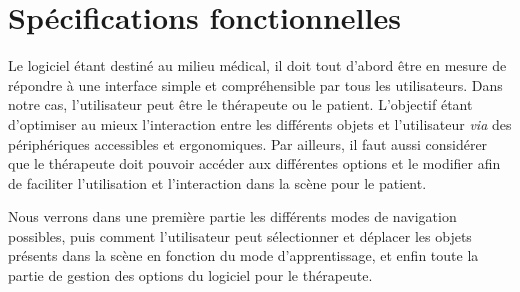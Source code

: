 \section{Spécifications fonctionnelles}

Le logiciel étant destiné au milieu médical, il doit tout d'abord être en mesure de répondre à une interface simple et compréhensible par tous les utilisateurs. Dans notre cas, l'utilisateur peut être le thérapeute ou le patient. L'objectif étant d'optimiser au mieux l'interaction entre les différents objets et l'utilisateur \textit{via} des périphériques accessibles et ergonomiques. Par ailleurs, il faut aussi considérer que le thérapeute doit pouvoir accéder aux différentes options et le modifier afin de faciliter l'utilisation et l'interaction dans la scène pour le patient.

Nous verrons dans une première partie les différents modes de navigation possibles, puis comment l'utilisateur peut sélectionner et déplacer les objets présents dans la scène en fonction du mode d'apprentissage, et enfin toute la partie de gestion des options du logiciel pour le thérapeute.


